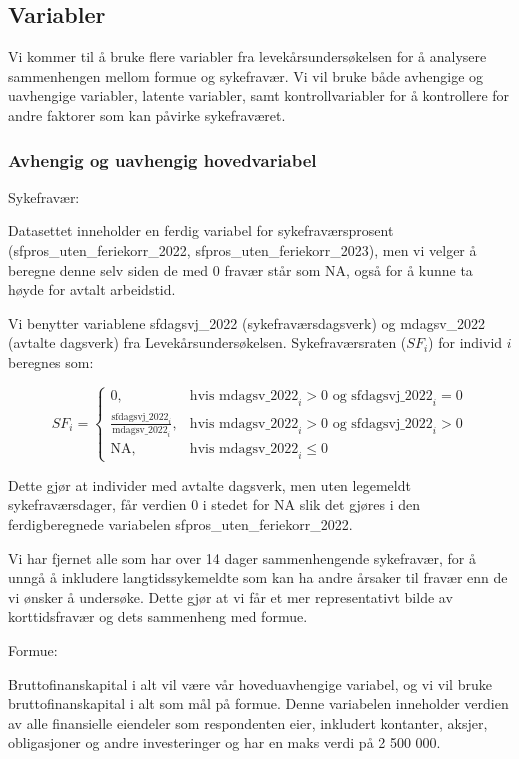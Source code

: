 \documentclass[
  12pt,
  a4paper,
  DIV=11,
  numbers=noendperiod]{scrartcl}
\begin{document}
\subsection{Variabler}\label{variabler}

Vi kommer til å bruke flere variabler fra levekårsundersøkelsen for å
analysere sammenhengen mellom formue og sykefravær. Vi vil bruke både
avhengige og uavhengige variabler, latente variabler, samt
kontrollvariabler for å kontrollere for andre faktorer som kan påvirke
sykefraværet.

\subsubsection{Avhengig og uavhengig
hovedvariabel}\label{avhengig-og-uavhengig-hovedvariabel}

Sykefravær:

Datasettet inneholder en ferdig variabel for sykefraværsprosent
(sfpros\_uten\_feriekorr\_2022, sfpros\_uten\_feriekorr\_2023), men vi
velger å beregne denne selv siden de med 0 fravær står som NA, også for
å kunne ta høyde for avtalt arbeidstid.

Vi benytter variablene sfdagsvj\_2022 (sykefraværsdagsverk) og
mdagsv\_2022 (avtalte dagsverk) fra Levekårsundersøkelsen.
Sykefraværsraten (\(SF_i\)) for individ \(i\) beregnes som:

\[
SF_i = 
\begin{cases}
0, & \text{hvis } \mathrm{mdagsv\_2022}_i > 0 \text{ og } \mathrm{sfdagsvj\_2022}_i = 0 \\
\frac{ \mathrm{sfdagsvj\_2022}_i }{ \mathrm{mdagsv\_2022}_i }, & \text{hvis } \mathrm{mdagsv\_2022}_i > 0 \text{ og } \mathrm{sfdagsvj\_2022}_i > 0 \\
\text{NA}, & \text{hvis } \mathrm{mdagsv\_2022}_i \leq 0
\end{cases}
\]

Dette gjør at individer med avtalte dagsverk, men uten legemeldt
sykefraværsdager, får verdien 0 i stedet for NA slik det gjøres i den
ferdigberegnede variabelen sfpros\_uten\_feriekorr\_2022.

Vi har fjernet alle som har over 14 dager sammenhengende sykefravær, for
å unngå å inkludere langtidssykemeldte som kan ha andre årsaker til
fravær enn de vi ønsker å undersøke. Dette gjør at vi får et mer
representativt bilde av korttidsfravær og dets sammenheng med formue.

Formue:

Bruttofinanskapital i alt vil være vår hoveduavhengige variabel, og vi
vil bruke bruttofinanskapital i alt som mål på formue. Denne variabelen
inneholder verdien av alle finansielle eiendeler som respondenten eier,
inkludert kontanter, aksjer, obligasjoner og andre investeringer og har
en maks verdi på 2 500 000.
\end{document}
